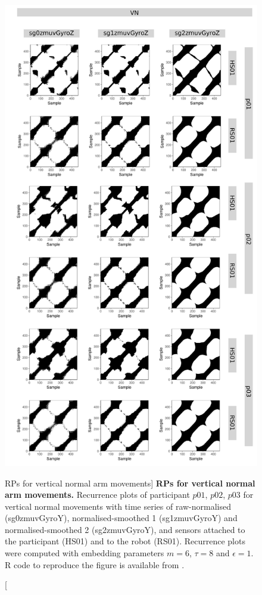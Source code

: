\begin{figure}
\centering
\includegraphics[height=0.80\textheight]{rp_VN}
\caption
	[RPs for vertical normal arm movements]{
	{\bf RPs for vertical normal arm movements.}	
	Recurrence plots %
	of participant $p01$, $p02$, $p03$ for vertical normal 
	movements with time series of raw-normalised (sg0zmuvGyroY), 
	normalised-smoothed 1 (sg1zmuvGyroY) and 
	normalised-smoothed 2 (sg2zmuvGyroY), and 
	sensors attached to the participant (HS01) and to the robot (RS01).
	Recurrence plots were computed with 
	embedding parameters $m=6$, $\tau=8$ and $\epsilon=1$.
	R code to reproduce the figure is available from \cite{hwum2018}.
        }
    \label{fig:rp_VN}
\end{figure}



